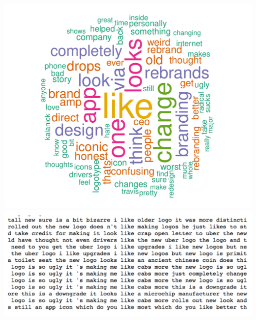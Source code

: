\documentclass[a222,landscape]{a0poster}
\begin{document}
\begin{multicols}{4}
\begin{center}
\includegraphics[width = .7\linewidth, height = 15 cm]{../figures/Poster_WordCloudLogo.pdf}
\hfill
\includegraphics[width = \linewidth, height = 10 cm]{../figures/Poster_LogoLike.png} 
\end{center}


\end{multicols}
\end{document}

